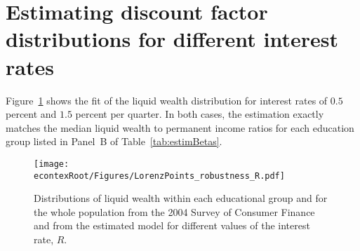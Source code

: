 \documentclass[\econtexRoot/HAFiscal]{subfiles}
\begin{document}

\hypertarget{Appendices}{} %

\section{Estimating discount factor distributions for different interest rates}
\label{app:DF_R}

Figure~\ref{fig:LorenzPts_robustness_R} shows the fit of the liquid wealth distribution for interest rates of $0.5$ percent and $1.5$ percent per quarter. In both cases, the estimation exactly matches the median liquid wealth to permanent income ratios for each education group listed in Panel~B of Table~\ref{tab:estimBetas}. 


\begin{figure}[th]
	\begin{center}
		\texttt{[image: \\econtexRoot/Figures/LorenzPoints\_robustness\_R.pdf]}
		\caption{Distributions of liquid wealth within each educational group and for the whole population from the 2004 Survey of Consumer Finance and from the estimated model for different values of the interest rate, $R$.}
		\label{fig:LorenzPts_robustness_R}
	\end{center}
\end{figure}
\end{document}
